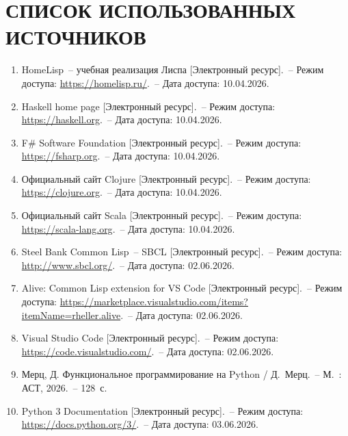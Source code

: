 \documentclass[14pt,a4paper]{extarticle}
\begin{document}
\section*{СПИСОК ИСПОЛЬЗОВАННЫХ ИСТОЧНИКОВ}

\begin{enumerate}[label=\arabic*,leftmargin=1.25cm]
  \item HomeLisp~-- учебная реализация Лиспа [Электронный ресурс].~-- Режим доступа: \url{https://homelisp.ru/}.~-- Дата доступа: 10.04.2026.
  \item Haskell home page [Электронный ресурс].~-- Режим доступа: \url{https://haskell.org}.~-- Дата доступа: 10.04.2026.
  \item F\# Software Foundation [Электронный ресурс].~-- Режим доступа: \url{https://fsharp.org}.~-- Дата доступа: 10.04.2026.
  \item Официальный сайт Clojure [Электронный ресурс].~-- Режим доступа: \url{https://clojure.org}.~-- Дата доступа: 10.04.2026.
  \item Официальный сайт Scala [Электронный ресурс].~-- Режим доступа: \url{https://scala-lang.org}.~-- Дата доступа: 10.04.2026.
  \item Steel Bank Common Lisp~-- SBCL [Электронный ресурс].~-- Режим доступа: \url{http://www.sbcl.org/}.~-- Дата доступа: 02.06.2026.
  \item Alive: Common Lisp extension for VS Code [Электронный ресурс].~-- Режим доступа: \url{https://marketplace.visualstudio.com/items?itemName=rheller.alive}.~-- Дата доступа: 02.06.2026.
  \item Visual Studio Code [Электронный ресурс].~-- Режим доступа: \url{https://code.visualstudio.com/}.~-- Дата доступа: 02.06.2026.
  \item Мерц, Д. Функциональное программирование на Python / Д.~Мерц.~-- М.~: АСТ, 2026.~-- 128~с.
  \item Python 3 Documentation [Электронный ресурс].~-- Режим доступа: \url{https://docs.python.org/3/}.~-- Дата доступа: 03.06.2026.
\end{enumerate}
\end{document}
